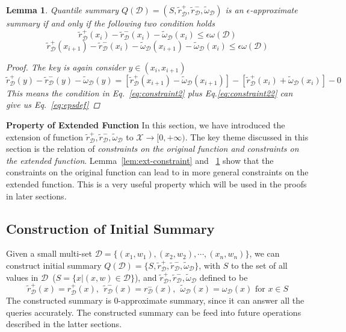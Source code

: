 \documentclass{sig-alternate-05-2015}
\newcommand{\eps}{\epsilon}
\newcommand{\Rplus}{[0, +\infty)}
\newcommand{\w}{\omega}
\newcommand{\sX}{\mathcal{X}}
\newcommand{\sD}{\mathcal{D}}
\newcommand{\tdr}{\tilde{r}_{\sD}}
\newcommand{\tdw}{\tilde{\omega}_{\sD}}
\newtheorem{thm:lemma}{Lemma}[section]
\begin{document}
\begin{thm:lemma}\label{lemma:eps}
Quantile summary $Q(\sD) = (S, \tdr^+, \tdr^-, \tdw)$ is an $\eps$-approximate summary if and only if the following two condition holds
\begin{equation}\label{eq:constraint22}
\tdr^{+}(x_i) - \tdr^{-}(x_i) - \tdw(x_i) \leq  \eps \w(\sD)
\end{equation}
\begin{equation}\label{eq:constraint2}
\tdr^{+}(x_{i+1}) - \tdr^{-}(x_i) - \tdw(x_{i+1}) - \tdw(x_{i}) \leq  \eps \w(\sD)
\end{equation}
\begin{proof}
The key is again consider $y\in(x_i, x_{i+1})$
$$
\tdr^{+}(y) - \tdr^{-}(y) - \tdw(y) =  [\tdr^+(x_{i+1})-\tdw(x_{i+1})]  - [ \tdr^+(x_{i})+\tdw(x_{i})] - 0
$$
This means the condition in Eq.~\eqref{eq:constraint2} plus Eq.\eqref{eq:constraint22} can give us Eq.~\eqref{eq:epsdef}
\end{proof}
\end{thm:lemma}

\noindent \textbf{Property of Extended Function} In this section, we have introduced the extension of function $\tdr^+, \tdr^-, \tdw$ to $\sX\rightarrow \Rplus$.
The key theme discussed in this section is the relation of \emph{constraints on the original function and constraints on the extended function}.
Lemma~\ref{lem:ext-constraint} and ~\ref{lemma:eps} show that the constraints on the original function can lead to in more general constraints on the extended function.
This is a very useful property which will be used in the proofs in later sections.

\subsection{Construction of Initial Summary}
Given a small multi-set $\sD = \{(x_1,w_1), (x_2,w_2),\cdots, (x_n,w_n)\}$, we can construct initial summary $Q(\sD) = \{S, \tdr^+, \tdr^-, \tdw\}$, with $S$ to the set of all values in $\sD$~($S = \{x|(x,w)\in \sD\}$), and $\tdr^+, \tdr^-, \tdw$ defined to be
\begin{equation}
\tdr^{+}(x)  = r^+_{\sD}(x), \ \  \tdr^{-}(x)  = r^-_{\sD}(x), \ \ \tdw(x) = \w_{\sD}(x) \mbox{ for } x \in S
\end{equation}
The constructed summary is $0$-approximate summary, since it can answer all the queries accurately. The constructed summary can be feed into future operations described in the latter sections.
\end{document}
